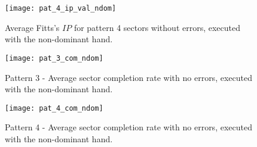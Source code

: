 \begin{appendices}
		\begin{figure}[!htb]
			\centering
			\texttt{[image: pat\_4\_ip\_val\_ndom]}
			\caption{Average Fitts's \(IP\) for pattern 4 sectors without errors, executed with the non-dominant hand.}
			\label{fig_pat_4_ip_ndom}
		\end{figure}
	
	\begin{figure}[!htb]
		\centering
		\texttt{[image: pat\_3\_com\_ndom]}
		\caption{Pattern 3 - Average sector completion rate with no errors, executed with the non-dominant hand.}
		\label{fig_pat_3_com_ndom}
	\end{figure}		
	
	\begin{figure}[!htb]
		\centering
		\texttt{[image: pat\_4\_com\_ndom]}
		\caption{Pattern 4 - Average sector completion rate with no errors, executed with the non-dominant hand.}
		\label{fig_pat_4_com_ndom}
	\end{figure}
	
\end{appendices}